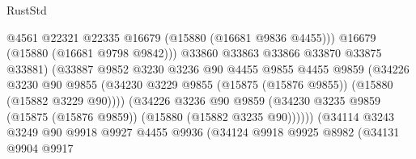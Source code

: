 \begin{lexlean}{RustStd}
\begin{coremodule}
                                          @4561
                                          @22321
                                          @22335
                                          @16679
                                          (@15880 (@16681 @9836 @4455)))
                                        @16679
                                        (@15880 (@16681 @9798 @9842)))
                                      @33860
                                      @33863
                                      @33866
                                      @33870
                                      @33875
                                      @33881)
                                    (@33887
                                      @9852
                                      @3230
                                      @3236
                                      @90
                                      @4455
                                      @9855
                                      @4455
                                      @9859
                                      (@34226
                                        @3230
                                        @90
                                        @9855
                                        (@34230
                                          @3229
                                          @9855
                                          (@15875 (@15876 @9855))
                                          (@15880 (@15882 @3229 @90))))
                                      (@34226
                                        @3236
                                        @90
                                        @9859
                                        (@34230
                                          @3235
                                          @9859
                                          (@15875 (@15876 @9859))
                                          (@15880 (@15882 @3235 @90))))))
                                  (@34114
                                    @3243
                                    @3249
                                    @90
                                    @9918
                                    @9927
                                    @4455
                                    @9936
                                    (@34124
                                      @9918
                                      @9925
                                      @8982
                                      (@34131
                                        @9904
                                        @9917

\end{coremodule}
\end{lexlean}

